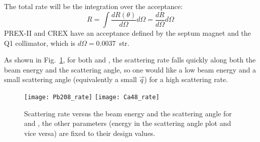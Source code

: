 The total rate will be the integration over the acceptance:
\begin{equation}
    R = \int \frac{dR(\theta)}{d\Omega} d\Omega = \frac{dR}{d\Omega} d\Omega
\end{equation}
PREX-II and CREX have an acceptance defined by the septum magnet and the Q1 collimator, 
which is $d\Omega = 0.0037$~str.

\begin{comment}
Finally, we should also consider the radiative correction due to emission of virtual
and real soft photons (Bremsstrahlung radiation), and hard photons by vacuum polarization,
this correction is formulated as:
\begin{equation}
    \eta = \left(\frac{\Delta}{E} \right)^{bt}
\end{equation}
which is evaluated to be: $\eta \sim 0.5$.
\end{comment}

As shown in Fig.~\ref{fig:scattering_rate}, for both \Pb and \Ca, the scattering 
rate falls quickly along both the beam energy and the scattering angle, 
so one would like a low beam energy and a small scattering angle (equivalently
a small $\vec{q}$) for a high scattering rate.
\begin{figure}[!h]
    \texttt{[image: Pb208\_rate]}
    \texttt{[image: Ca48\_rate]}
    \caption[Scattering rate]
    {Scattering rate versus the beam energy and the scattering angle for \Pb and \Ca,
    the other parameters (energy in the scattering angle plot and vice versa) 
    are fixed to their design values.}
    \label{fig:scattering_rate}
\end{figure}

